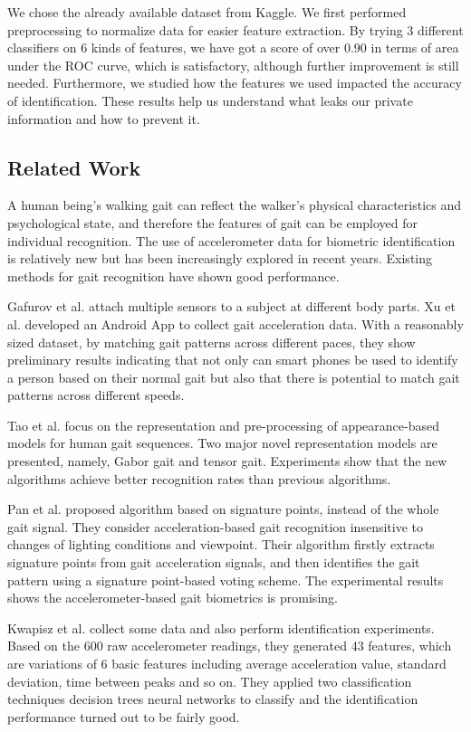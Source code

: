 \documentclass{article} %
\begin{document}
We chose the already available dataset from Kaggle. We first performed preprocessing to normalize data for easier feature extraction. By trying 3 different classifiers on 6 kinds of features, we have got a score of over 0.90 in terms of area under the ROC curve, which is satisfactory, although further improvement is still needed. Furthermore, we studied how the features we used impacted the accuracy of identification. These results help us understand what leaks our private information and how to prevent it.

\subsection{Related Work} 

A human being's walking gait can reflect the walker's physical characteristics and psychological state, and therefore the features of gait can be employed for individual recognition. The use of accelerometer data for biometric identification is relatively new but has been increasingly explored in recent years. Existing methods for gait recognition have shown good performance.
 
Gafurov et al.\cite{Gafurov:AIAT2007} attach multiple sensors to a subject at different body parts. Xu et al.\cite{Xu:ICB2012} developed an Android App to collect gait acceleration data. With a reasonably sized dataset, by matching gait patterns across different paces, they show preliminary results indicating that not only can smart phones be used to identify a person based on their normal gait but also that there is potential to match gait patterns across different speeds.

Tao et al.\cite{Tao:ToPAMI2007} focus on the representation and pre-processing of appearance-based models for human gait sequences. Two major novel representation models are presented, namely, Gabor gait and tensor gait. Experiments show that the new algorithms achieve better recognition rates than previous algorithms.

Pan et al.\cite{Pan:EL2009} proposed algorithm based on signature points, instead of the whole gait signal. They consider acceleration-based gait recognition insensitive to changes of lighting conditions and viewpoint. Their algorithm firstly extracts signature points from gait acceleration signals, and then identifies the gait pattern using a signature point-based voting scheme. The experimental results shows the accelerometer-based gait biometrics is promising. 

Kwapisz et al.\cite{Kwapisz:BTAS2009} collect some data and also perform identification experiments. Based on the 600 raw accelerometer readings, they generated 43 features, which are variations of 6 basic features including average acceleration value, standard deviation, time between peaks and so on. They applied two classification techniques decision trees neural networks to classify and the identification performance turned out to be fairly good.
\end{document}
